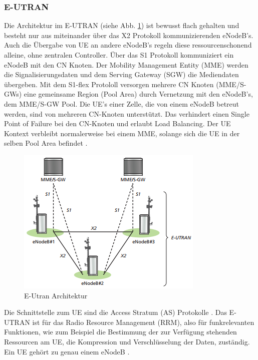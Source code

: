 \subsubsection{E-UTRAN}
\label{subsubsec:eutran}
Die Architektur im E-UTRAN (siehe Abb. \ref{fig:eutranarchitektur}) ist bewusst flach gehalten und besteht nur aus miteinander über das X2 Protokoll kommunizierenden eNodeB's. Auch die Übergabe von UE an andere eNodeB's regeln diese ressourcenschonend alleine, ohne zentralen Controller. Über das S1 Protokoll kommuniziert ein eNodeB mit den CN Knoten. Der Mobility Management Entity (MME) werden die Signalisierungsdaten und dem Serving Gateway (SGW) die Mediendaten übergeben. Mit dem S1-flex Protololl versorgen mehrere CN Knoten (MME/S-GWs) eine gemeinsame Region (Pool Area) durch Vernetzung mit den eNodeB's, dem MME/S-GW Pool. Die UE's einer Zelle, die von einem eNodeB betreut werden, sind von mehreren CN-Knoten unterstützt. Das verhindert einen Single Point of Failure bei den CN-Knoten und erlaubt Load Balancing. Der UE Kontext verbleibt normalerweise bei einem MME, solange sich die UE in der selben Pool Area befindet \cite{Ses11}.
\begin{figure}[H]
	\centering
	\includegraphics[width=1\linewidth]{images/E_UTRAN_Architektur}
	\caption[]{E-Utran Architektur \protect\cite{Ses11}}
	\label{fig:eutranarchitektur}
\end{figure}
Die Schnittstelle zum UE sind die Access Stratum (AS) Protokolle \cite[S. 131]{Sau06}. Das E-UTRAN ist für das Radio Resource Management (RRM), also für funkrelevanten Funktionen, wie zum Beispiel die Bestimmung der zur Verfügung stehenden Ressourcen  am UE, die Kompression und Verschlüsselung der Daten, zuständig. Ein UE gehört zu genau einem eNodeB \cite{Ses11}.
